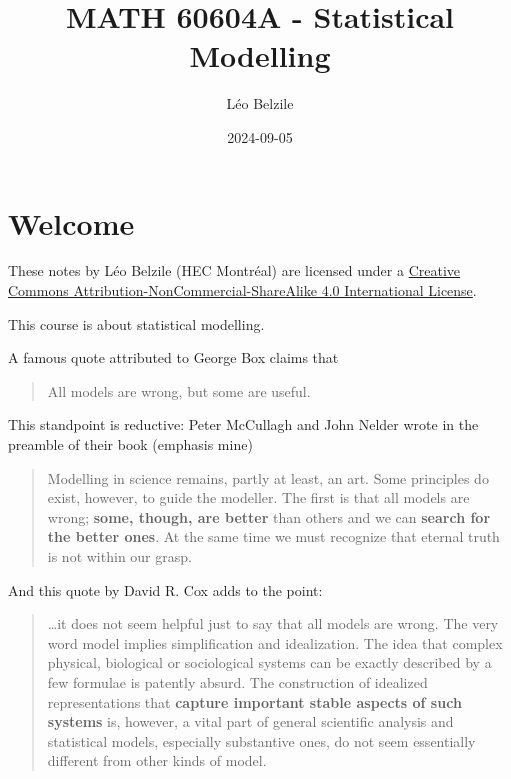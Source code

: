 \documentclass[
  11pt,
  letterpaper,
]{scrbook}
\title{MATH 60604A - Statistical Modelling}
\author{Léo Belzile}
\date{2024-09-05}
\renewcommand*\contentsname{Table of contents}
\newcommand\contentsname{Table of contents}
\theoremstyle{definition}
\theoremstyle{definition}
\theoremstyle{plain}
\theoremstyle{remark}
\begin{document}


\renewcommand*\contentsname{Table of contents}
{
\setcounter{tocdepth}{2}
\tableofcontents
}

\mainmatter
{}

\chapter*{Welcome}\label{welcome}


These notes by Léo Belzile (HEC Montréal) are licensed under a
\href{http://creativecommons.org/licenses/by-nc-sa/4.0/}{Creative
Commons Attribution-NonCommercial-ShareAlike 4.0 International License}.

This course is about statistical modelling.

A famous quote attributed to George Box claims that

\begin{quote}
All models are wrong, but some are useful.
\end{quote}

This standpoint is reductive: Peter McCullagh and John Nelder wrote in
the preamble of their book (emphasis mine)

\begin{quote}
Modelling in science remains, partly at least, an art. Some principles
do exist, however, to guide the modeller. The first is that all models
are wrong; \textbf{some, though, are better} than others and we can
\textbf{search for the better ones}. At the same time we must recognize
that eternal truth is not within our grasp.
\end{quote}

And this quote by David R. Cox adds to the point:

\begin{quote}
\ldots it does not seem helpful just to say that all models are wrong.
The very word model implies simplification and idealization. The idea
that complex physical, biological or sociological systems can be exactly
described by a few formulae is patently absurd. The construction of
idealized representations that \textbf{capture important stable aspects
of such systems} is, however, a vital part of general scientific
analysis and statistical models, especially substantive ones, do not
seem essentially different from other kinds of model.
\end{quote}
\end{document}
